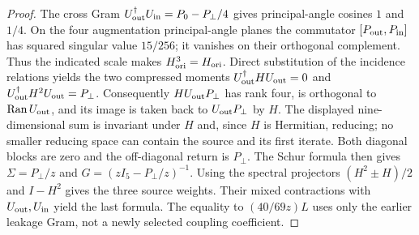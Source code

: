 \documentclass[11pt]{article}
\begin{document}
\begin{proof}
The cross Gram $U_{\rm out}^{\dagger}U_{\rm in}
=P_0-P_\perp/4$ gives principal-angle cosines $1$ and $1/4$.
On the four augmentation principal-angle planes the commutator
$[P_{\rm out},P_{\rm in}]$ has squared singular value $15/256$;
it vanishes on their orthogonal complement. Thus the indicated scale
makes $H_{\rm ori}^3=H_{\rm ori}$. Direct substitution of the
incidence relations yields the two compressed moments
$U_{\rm out}^{\dagger}HU_{\rm out}=0$ and
$U_{\rm out}^{\dagger}H^2U_{\rm out}=P_\perp$.
Consequently $H U_{\rm out}P_\perp$ has rank four, is orthogonal to
$\operatorname{Ran}U_{\rm out}$, and its image is taken back to
$U_{\rm out}P_\perp$ by $H$. The displayed nine-dimensional sum
is invariant under $H$ and, since $H$ is Hermitian, reducing; no
smaller reducing space can contain the source and its first iterate.
Both diagonal blocks are zero and the off-diagonal return is
$P_\perp$. The Schur formula then gives
$\Sigma=P_\perp/z$ and $G=(zI_5-P_\perp/z)^{-1}$.
Using the spectral projectors $(H^2\pm H)/2$ and $I-H^2$ gives the
three source weights. Their mixed contractions with
$U_{\rm out},U_{\rm in}$ yield the last formula. The equality to
$(40/69z)L$ uses only the earlier leakage Gram, not a newly
selected coupling coefficient.
\end{proof}
\end{document}

